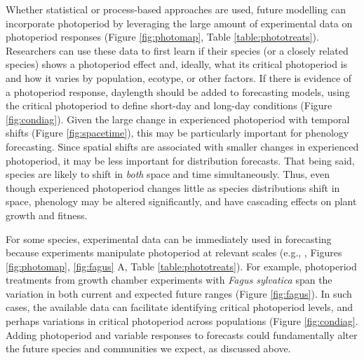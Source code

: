 \documentclass{article}
\begin{document}
\par Whether statistical or process-based approaches are used, future modelling can incorporate photoperiod by leveraging the large amount of experimental data on photoperiod responses (Figure \ref{fig:photomap}, Table \ref{table:phototreats}). Researchers can use these data to first learn if their species (or a closely related species) shows a photoperiod effect and, ideally, what its critical photoperiod is and how it varies by population, ecotype, or other factors. If there is evidence of a photoperiod response, daylength should be added to forecasting models, using the critical photoperiod to define short-day and long-day conditions (Figure \ref{fig:condiag}). Given the large change in experienced photoperiod with temporal shifts (Figure \ref{fig:spacetime}), this may be particularly important for phenology forecasting. Since spatial shifts are associated with smaller changes in experienced photoperiod, it may be less important for distribution forecasts.
That being said, species are likely to shift in \emph{both} space and time simultaneously. Thus, even though experienced photoperiod changes little as species distributions shift in space, phenology may be altered significantly, and have cascading effects on plant growth and fitness\citep{duputie2015}. 
\par For some species, experimental data can be immediately used in forecasting because experiments manipulate photoperiod at relevant scales (e.g., \citet{Basler:2014aa,Heide:2015aa}, Figures \ref{fig:photomap}, \ref{fig:fagus} A, Table \ref{table:phototreats}).  For example, photoperiod treatments from growth chamber experiments with \emph{Fagus sylvatica} span the variation in both current and expected future ranges (Figure \ref{fig:fagus}). In such cases, the available data can facilitate identifying critical photoperiod levels, and perhaps variations in critical photoperiod across populations (Figure \ref{fig:condiag}.  Adding photoperiod and variable responses to forecasts could fundamentally alter the future species and communities we expect, as discussed above. 
\end{document}
